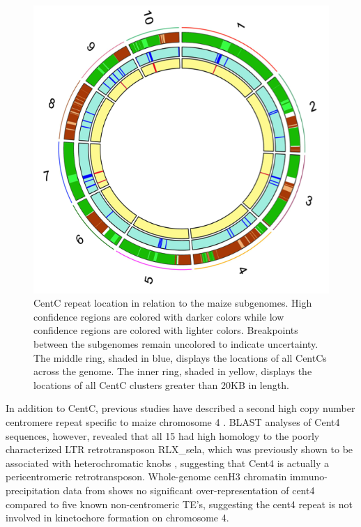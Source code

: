 {\begin{figure}
  \includegraphics{circos.png}
\caption{CentC repeat location in relation to the maize subgenomes.  High confidence regions are colored with darker colors while low confidence regions are colored with lighter colors.  Breakpoints between the subgenomes remain uncolored to indicate uncertainty. The middle ring, shaded in blue, displays the locations of all CentCs across the genome.  The inner ring, shaded in yellow, displays the locations of all CentC clusters greater than 20KB in length.}
\label{circos}    
\end{figure}

In addition to CentC, previous studies have described a second high copy number centromere repeat specific to maize chromosome 4 \citep{Page2001}.   BLAST analyses of Cent4 sequences, however, revealed that all 15 had high homology to the poorly characterized LTR retrotransposon RLX\_sela, which was previously shown to be associated with heterochromatic  knobs \citep{Tenaillon2011, Chia2012}, suggesting that Cent4 is actually a pericentromeric retrotransposon.  Whole-genome cenH3 chromatin immuno-precipitation data from  \citet{Wolfgruber2009} shows no significant over-representation of cent4 compared to five known non-centromeric TE’s, suggesting the cent4 repeat is not involved in kinetochore formation on chromosome 4.
	
}
